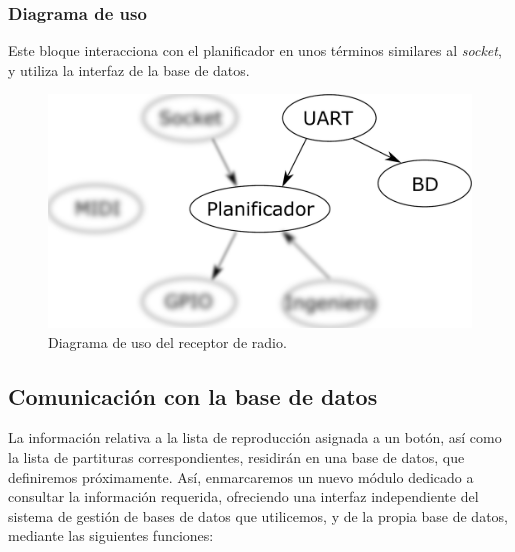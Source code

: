 \subsubsection{Diagrama de uso}

Este bloque interacciona con el planificador en unos términos similares al \textit{socket}, y utiliza la interfaz de la base de datos.

\smallskip

\begin{figure}[H]
	\noindent \begin{centering}
		\includegraphics[width=\linewidth/2]{capitulo4/daemon_uart}
		\par\end{centering}
	\smallskip
	\caption{\label{fig:daemon_uart} Diagrama de uso del receptor de radio.}
\end{figure} 

\smallskip

\subsection{Comunicación con la base de datos}

La información relativa a la lista de reproducción asignada a un botón, así como la lista de partituras correspondientes, residirán en una base de datos, que definiremos próximamente. Así, enmarcaremos un nuevo módulo dedicado a consultar la información requerida, ofreciendo una interfaz independiente del sistema de gestión de bases de datos que utilicemos, y de la propia base de datos, mediante las siguientes funciones:

